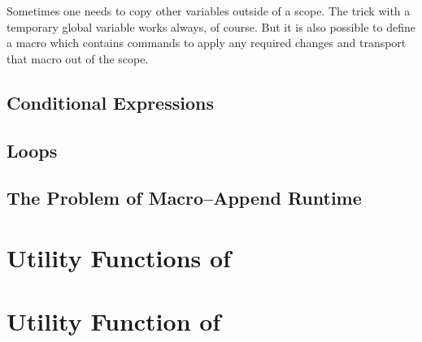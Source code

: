 Sometimes one needs to copy other variables outside of a scope. The trick with a temporary global variable works always, of course. But it is also possible to define a macro which contains commands to apply any required changes and transport that macro out of the scope.

\subsection{Conditional Expressions}

\subsection{Loops}

\subsection{The Problem of Macro--Append Runtime}

\section{Utility Functions of \PGF}

\section{Utility Function of \PGFPlots}

\printindex



